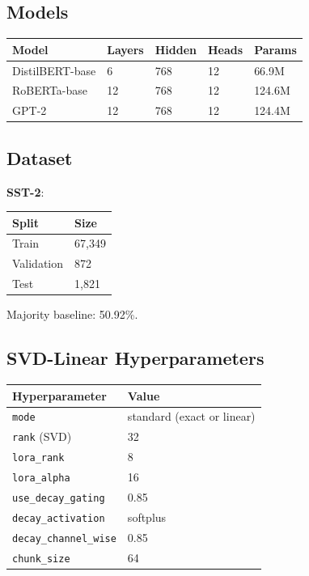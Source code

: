 \subsection{Models}

\begin{table}[H]
\centering
\small
\begin{tabular}{lllll}
\toprule
\textbf{Model} & \textbf{Layers} & \textbf{Hidden} & \textbf{Heads} & \textbf{Params} \\
\midrule
DistilBERT-base & 6 & 768 & 12 & 66.9M \\
RoBERTa-base & 12 & 768 & 12 & 124.6M \\
GPT-2 & 12 & 768 & 12 & 124.4M \\
\bottomrule
\end{tabular}
\end{table}

\subsection{Dataset}

\textbf{SST-2}:

\begin{table}[H]
\centering
\small
\begin{tabular}{ll}
\toprule
\textbf{Split} & \textbf{Size} \\
\midrule
Train & 67,349 \\
Validation & 872 \\
Test & 1,821 \\
\bottomrule
\end{tabular}
\end{table}

Majority baseline: 50.92\%.

\subsection{SVD-Linear Hyperparameters}

\begin{table}[H]
\centering
\small
\begin{tabular}{ll}
\toprule
\textbf{Hyperparameter} & \textbf{Value} \\
\midrule
\texttt{mode} & standard (exact or linear) \\
\texttt{rank} (SVD) & 32 \\
\texttt{lora\_rank} & 8 \\
\texttt{lora\_alpha} & 16 \\
\texttt{use\_decay\_gating} & 0.85 \\
\texttt{decay\_activation} & softplus \\
\texttt{decay\_channel\_wise} & 0.85 \\
\texttt{chunk\_size} & 64 \\
\bottomrule
\end{tabular}
\end{table}

